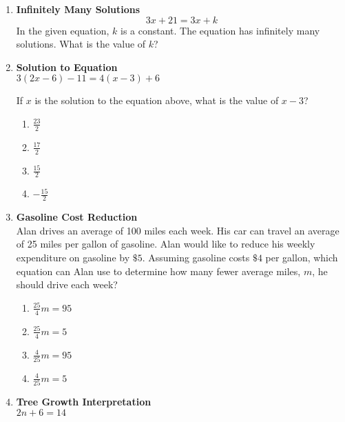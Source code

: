 \begin{enumerate}
\item \textbf{Infinitely Many Solutions}\\
$$
3x + 21 = 3x + k
$$
In the given equation, $k$ is a constant. The equation has infinitely many solutions. What is the value of $k$?
\begin{subanswer}
\end{subanswer}

\item \textbf{Solution to Equation}\\
$3(2x - 6) - 11 = 4(x - 3) + 6$

If $x$ is the solution to the equation above, what is the value of $x - 3$?
\begin{enumerate}[label=(\Alph*)]
  \item $\frac{23}{2}$
  \item $\frac{17}{2}$
  \item $\frac{15}{2}$
  \item $-\frac{15}{2}$
\end{enumerate}
\begin{subanswer}
\end{subanswer}

\item \textbf{Gasoline Cost Reduction}\\
Alan drives an average of 100 miles each week. His car can travel an average of 25 miles per gallon of gasoline. Alan would like to reduce his weekly expenditure on gasoline by $\$ 5$. Assuming gasoline costs $\$ 4$ per gallon, which equation can Alan use to determine how many fewer average miles, $m$, he should drive each week?
\begin{enumerate}[label=(\Alph*)]
  \item $\frac{25}{4}m = 95$
  \item $\frac{25}{4}m = 5$
  \item $\frac{4}{25}m = 95$
  \item $\frac{4}{25}m = 5$
\end{enumerate}
\begin{subanswer}
\end{subanswer}

\item \textbf{Tree Growth Interpretation}\\
$2n + 6 = 14$


\end{enumerate}
